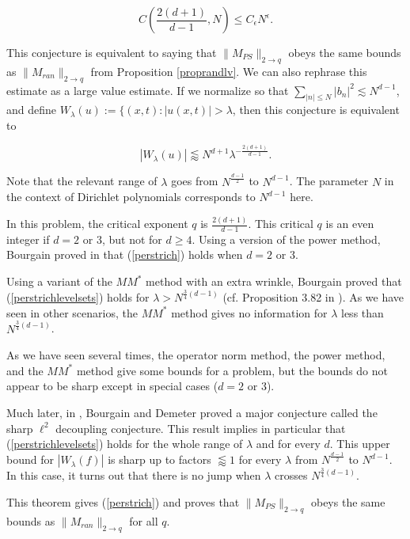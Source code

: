 \documentclass{amsart}
\newcommand{\eps}{\epsilon}
\begin{document}
\begin{equation} \label{perstrich} C(\frac{2(d+1)}{d-1},  N) \le C_\eps N^\eps.  \end{equation}

This conjecture is equivalent to saying that $\| M_{PS} \|_{2 \rightarrow q}$ obeys the same bounds as $\| M_{ran} \|_{2 \rightarrow q}$ from Proposition \ref{proprandlv}.   We can also rephrase this estimate as a large value estimate.  
If we normalize so that $\sum_{|n| \le N} |b_n|^2 \lesssim N^{d-1}$,  and define $W_\lambda(u) := \{ (x,t): |u(x,t)| > \lambda$,  then this conjecture is equivalent to

\begin{equation} \label{perstrichlevelsets}  | W_\lambda(u) | \lessapprox N^{d+1} \lambda^{- \frac{2(d+1)}{d-1}}. 
\end{equation}

Note that the relevant range of $\lambda$ goes from $N^{\frac{d-1}{2}}$ to $N^{d-1}$.   The parameter $N$ in the context of Dirichlet polynomials corresponds to $N^{d-1}$ here.  

In this problem,  the critical exponent $q$ is $\frac{2(d+1)}{d-1}$.   This critical $q$ is an even integer if $d=2$ or 3,  but not for $d \ge 4$.   Using a version of the power method,  Bourgain proved in \cite{B4} that (\ref{perstrich}) holds when $d = 2$ or $3$.


Using a variant of the $M M^*$ method with an extra wrinkle,  Bourgain proved that (\ref{perstrichlevelsets}) holds for $\lambda >  N^{\frac{3}{4}( d-1)}$ (cf. Proposition 3.82 in \cite{B4}).   As we have seen in other scenarios,  the $M M^*$ method gives no information for $\lambda$ less than $N^{\frac{3}{4}(d-1)}$.  

As we have seen several times,  the operator norm method,  the power method,  and the $M M^*$ method give some bounds for a problem,  but the bounds do not appear to be sharp except in special cases ($d=2$ or 3).   

Much later,  in \cite{BD},  Bourgain and Demeter proved a major conjecture called the sharp $\ell^2$ decoupling conjecture.   This result implies in particular that (\ref{perstrichlevelsets}) holds for the whole range of $\lambda$ and for every $d$.   This upper bound for $|W_\lambda(f)|$ is sharp up to factors $\lessapprox 1$ for every $\lambda$  from $N^{\frac{d-1}{2}}$ to $N^{d-1}$.   In this case,  it turns out that there is no jump when $\lambda$ crosses $N^{\frac{3}{4}(d-1)}$. 

This theorem gives (\ref{perstrich}) and proves that $\| M_{PS} \|_{2 \rightarrow q}$ obeys the same bounds as $\| M_{ran} \|_{2 \rightarrow q}$ for all $q$. 
\end{document}
